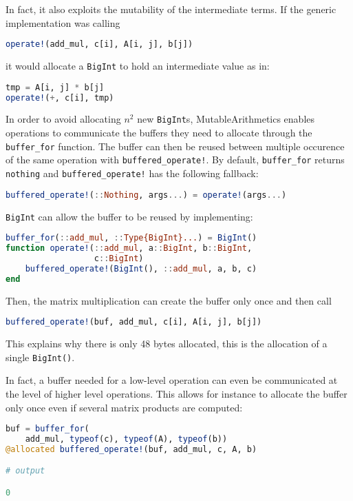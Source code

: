 \documentclass{juliacon}
\newcommand{\ma}{MutableArithmetics}
\begin{document}
In fact, it also exploits the mutability of the intermediate terms.
If the generic implementation was calling
\begin{lstlisting}[language = Julia]
operate!(add_mul, c[i], A[i, j], b[j])
\end{lstlisting}
it would allocate a \lstinline|BigInt| to hold an intermediate value as in:
\begin{lstlisting}[language = Julia]
tmp = A[i, j] * b[j]
operate!(+, c[i], tmp)
\end{lstlisting}
In order to avoid allocating $n^2$ new \lstinline|BigInt|s,
\ma{} enables operations to communicate the buffers they need to allocate through the \lstinline|buffer_for| function.
The buffer can then be reused between multiple occurence of the same operation with \lstinline|buffered_operate!|.
By default, \lstinline|buffer_for| returns \lstinline|nothing|
and \lstinline|buffered_operate!| has the following fallback:
\begin{lstlisting}[language = Julia]
buffered_operate!(::Nothing, args...) = operate!(args...)
\end{lstlisting}
\lstinline|BigInt| can allow the buffer to be reused by implementing:
\begin{lstlisting}[language = Julia]
buffer_for(::add_mul, ::Type{BigInt}...) = BigInt()
function operate!(::add_mul, a::BigInt, b::BigInt,
                  c::BigInt)
    buffered_operate!(BigInt(), ::add_mul, a, b, c)
end
\end{lstlisting}
Then, the matrix multiplication can create the buffer
only once and then call
\begin{lstlisting}[language = Julia]
buffered_operate!(buf, add_mul, c[i], A[i, j], b[j])
\end{lstlisting}
This explains why there is only 48 bytes allocated, this is the
allocation of a single \lstinline|BigInt()|.

In fact, a buffer needed for a low-level operation can even be communicated
at the level of higher level operations.
This allows for instance to allocate the buffer only once even if
several matrix products are computed:
\begin{lstlisting}[language = Julia]
buf = buffer_for(
    add_mul, typeof(c), typeof(A), typeof(b))
@allocated buffered_operate!(buf, add_mul, c, A, b)

# output

0
\end{lstlisting}
\end{document}
